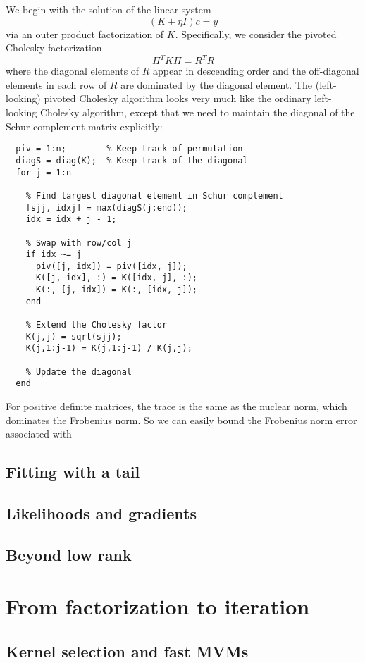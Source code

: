 \documentclass[12pt, leqno]{article} %
\begin{document}
We begin with the solution of the linear system
\[
  (K + \eta I) c = y
\]
via an outer product factorization of $K$.  Specifically, we consider
the pivoted Cholesky factorization
\[
  \Pi^T K \Pi = R^T R
\]
where the diagonal elements of $R$ appear in descending order and
the off-diagonal elements in each row of $R$ are dominated by the
diagonal element.  The (left-looking) pivoted Cholesky algorithm
looks very much like the ordinary left-looking Cholesky algorithm,
except that we need to maintain the diagonal of the Schur complement
matrix explicitly:
\begin{lstlisting}
  piv = 1:n;        % Keep track of permutation
  diagS = diag(K);  % Keep track of the diagonal
  for j = 1:n

    % Find largest diagonal element in Schur complement
    [sjj, idxj] = max(diagS(j:end));
    idx = idx + j - 1;

    % Swap with row/col j
    if idx ~= j
      piv([j, idx]) = piv([idx, j]);
      K([j, idx], :) = K([idx, j], :);
      K(:, [j, idx]) = K(:, [idx, j]);
    end

    % Extend the Cholesky factor
    K(j,j) = sqrt(sjj);
    K(j,1:j-1) = K(j,1:j-1) / K(j,j);
    
    % Update the diagonal 
  end
\end{lstlisting}

For positive definite matrices, the trace is the same as the nuclear
norm, which dominates the Frobenius norm.  So we can easily bound the
Frobenius norm error associated with

\subsection{Fitting with a tail}

\subsection{Likelihoods and gradients}

\subsection{Beyond low rank}

\section{From factorization to iteration}

\subsection{Kernel selection and fast MVMs}
\end{document}
